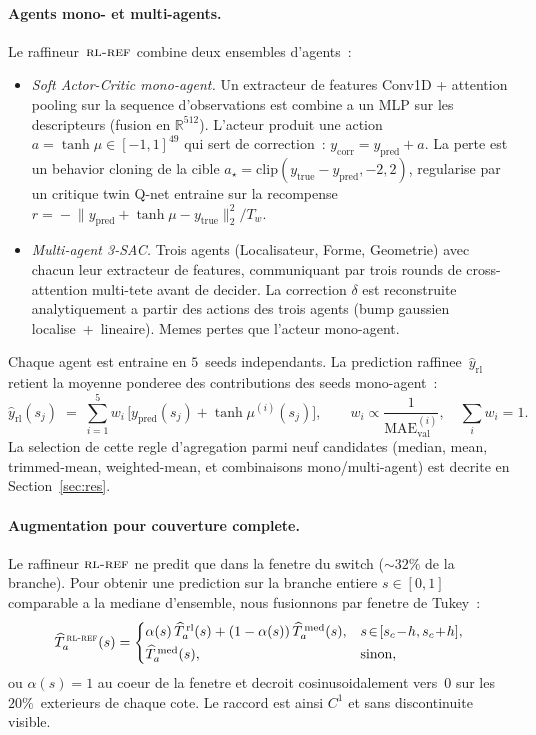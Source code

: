 \documentclass[11pt,a4paper]{article}
\newcommand{\R}{\mathbb{R}}
\newcommand{\Ta}{T_a}
\newcommand{\RLR}{\textsc{rl-ref}}           %
\begin{document}
\paragraph{Agents mono- et multi-agents.} Le raffineur~$\RLR$
combine deux ensembles d'agents~:
\begin{itemize}[leftmargin=*,itemsep=1pt,topsep=2pt]
\item \emph{Soft Actor-Critic mono-agent.} Un extracteur de
   features Conv1D + attention pooling sur la sequence d'observations
   est combine a un MLP sur les descripteurs (fusion en
   $\R^{512}$). L'acteur produit une action
   $a\!=\!\tanh\mu\!\in\![-1,1]^{49}$ qui sert de correction~:
   $y_\text{corr}\!=\!y_\text{pred}\!+\!a$. La perte est un
   behavior cloning de la cible
   $a_\star\!=\!\mathrm{clip}(y_\text{true}\!-\!y_\text{pred},-2,2)$,
   regularise par un critique twin Q-net entraine sur la
   recompense
   $r\!=\!-\!\|y_\text{pred}\!+\!\tanh\mu\!-\!y_\text{true}\|_2^2/T_w$.
\item \emph{Multi-agent 3-SAC.} Trois agents (Localisateur, Forme,
   Geometrie) avec chacun leur extracteur de features, communiquant
   par trois rounds de cross-attention multi-tete avant de
   decider. La correction $\delta$ est reconstruite analytiquement
   a partir des actions des trois agents (bump gaussien
   localise~+~lineaire). Memes pertes que l'acteur mono-agent.
\end{itemize}
Chaque agent est entraine en $5$~seeds independants. La prediction
raffinee~$\widehat y_\text{rl}$ retient la moyenne ponderee des
contributions des seeds mono-agent~:
\begin{equation}
\widehat y_\text{rl}(s_j) \;=\; \sum_{i=1}^{5} w_i\,
\bigl[y_\text{pred}(s_j) + \tanh\mu^{(i)}(s_j)\bigr],
\qquad
w_i \propto \frac{1}{\mathrm{MAE}_\text{val}^{(i)}},
\quad \sum_i w_i = 1.
\label{eq:rl_agg}
\end{equation}
La selection de cette regle d'agregation parmi neuf candidates
(median, mean, trimmed-mean, weighted-mean, et combinaisons
mono/multi-agent) est decrite en Section~\ref{sec:res}.

\paragraph{Augmentation pour couverture complete.} Le raffineur
$\RLR$ ne predit que dans la fenetre du switch ($\sim\!32\%$ de
la branche). Pour obtenir une prediction sur la branche entiere
$s\!\in\![0,1]$ comparable a la mediane d'ensemble, nous fusionnons
par fenetre de Tukey~:
\begin{equation}
\widehat\Ta^{\,\RLR}(s) =
\begin{cases}
\alpha(s)\,\widehat\Ta^{\,\text{rl}}(s) + (1-\alpha(s))\,\widehat\Ta^{\,\text{med}}(s),
& s\!\in\![s_c\!-\!h,s_c\!+\!h],\\[2pt]
\widehat\Ta^{\,\text{med}}(s), & \text{sinon},
\end{cases}
\end{equation}
ou $\alpha(s)\!=\!1$ au coeur de la fenetre et decroit
cosinusoidalement vers~$0$ sur les $20\%$~exterieurs de chaque
cote. Le raccord est ainsi $C^1$ et sans discontinuite visible.
\end{document}
